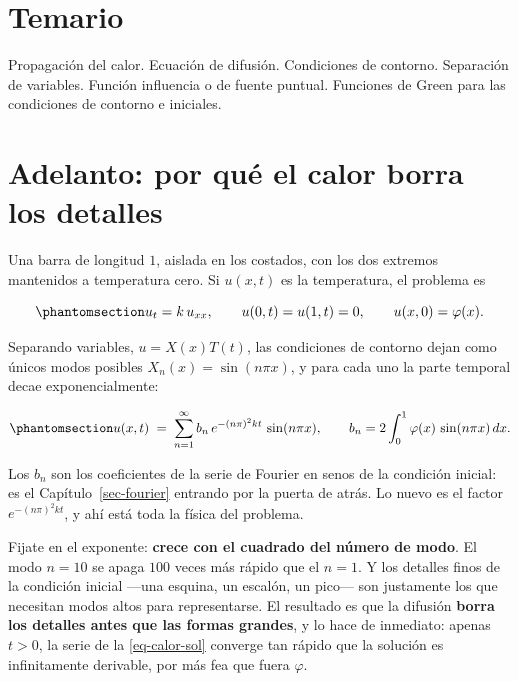 \documentclass[
  spanish,
  a4paper,
]{scrbook}
\theoremstyle{definition}
\theoremstyle{plain}
\theoremstyle{definition}
\theoremstyle{plain}
\theoremstyle{definition}
\theoremstyle{remark}
\begin{document}
\section*{Temario}\label{temario-7}


Propagación del calor. Ecuación de difusión. Condiciones de contorno.
Separación de variables. Función influencia o de fuente puntual.
Funciones de Green para las condiciones de contorno e iniciales.

\section*{Adelanto: por qué el calor borra los
detalles}\label{adelanto-por-quuxe9-el-calor-borra-los-detalles}


Una barra de longitud \(1\), aislada en los costados, con los dos
extremos mantenidos a temperatura cero. Si \(u(x,t)\) es la temperatura,
el problema es

\begin{equation}\protect\phantomsection\label{eq-calor}{
u_t = k\,u_{xx}, \qquad u(0,t) = u(1,t) = 0, \qquad u(x,0) = \varphi(x).
}\end{equation}

Separando variables, \(u = X(x)T(t)\), las condiciones de contorno dejan
como únicos modos posibles \(X_n(x) = \sin(n\pi x)\), y para cada uno la
parte temporal decae exponencialmente:

\begin{equation}\protect\phantomsection\label{eq-calor-sol}{
u(x,t) \;=\; \sum_{n=1}^{\infty} b_n\, e^{-(n\pi)^2 k t}\, \sin(n\pi x),
\qquad b_n = 2\int_0^1 \varphi(x)\,\sin(n\pi x)\,dx .
}\end{equation}

Los \(b_n\) son los coeficientes de la serie de Fourier en senos de la
condición inicial: es el Capítulo~\ref{sec-fourier} entrando por la
puerta de atrás. Lo nuevo es el factor \(e^{-(n\pi)^2kt}\), y ahí está
toda la física del problema.

Fijate en el exponente: \textbf{crece con el cuadrado del número de
modo}. El modo \(n=10\) se apaga \(100\) veces más rápido que el
\(n=1\). Y los detalles finos de la condición inicial ---una esquina, un
escalón, un pico--- son justamente los que necesitan modos altos para
representarse. El resultado es que la difusión \textbf{borra los
detalles antes que las formas grandes}, y lo hace de inmediato: apenas
\(t>0\), la serie de la \ref{eq-calor-sol} converge tan rápido que la
solución es infinitamente derivable, por más fea que fuera \(\varphi\).
\end{document}
